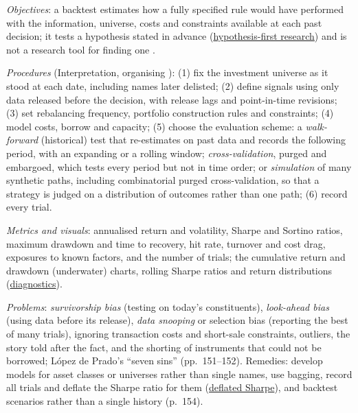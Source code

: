 \begin{qfmethod}\label{meth:backtest-design-evaluation}
 \emph{Objectives}: a backtest estimates how a fully specified rule would have performed with the information, universe, costs and constraints available at each past decision; it tests a hypothesis stated in advance (\hyperref[meth:hypothesis-driven-strategy-research]{hypothesis-first research}) and is not a research tool for finding one \citep[pp.~151--154]{alpha-afml}.

\emph{Procedures} (Interpretation, organising \citep[pp.~161--166]{alpha-afml}): (1) fix the investment universe as it stood at each date, including names later delisted; (2) define signals using only data released before the decision, with release lags and point-in-time revisions; (3) set rebalancing frequency, portfolio construction rules and constraints; (4) model costs, borrow and capacity; (5) choose the evaluation scheme: a \emph{walk-forward} (historical) test that re-estimates on past data and records the following period, with an expanding or a rolling window; \emph{cross-validation}, purged and embargoed, which tests every period but not in time order; or \emph{simulation} of many synthetic paths, including combinatorial purged cross-validation, so that a strategy is judged on a distribution of outcomes rather than one path; (6) record every trial.

\emph{Metrics and visuals}: annualised return and volatility, Sharpe and Sortino ratios, maximum drawdown and time to recovery, hit rate, turnover and cost drag, exposures to known factors, and the number of trials; the cumulative return and drawdown (underwater) charts, rolling Sharpe ratios and return distributions (\hyperref[meth:backtest-evaluation-diagnostics]{diagnostics}).

\emph{Problems}: \emph{survivorship bias} (testing on today's constituents), \emph{look-ahead bias} (using data before its release), \emph{data snooping} or selection bias (reporting the best of many trials), ignoring transaction costs and short-sale constraints, outliers, the story told after the fact, and the shorting of instruments that could not be borrowed; L\'opez de Prado's ``seven sins'' (pp.~151--152). Remedies: develop models for asset classes or universes rather than single names, use bagging, record all trials and deflate the Sharpe ratio for them (\hyperref[meth:deflated-sharpe-ratio]{deflated Sharpe}), and backtest scenarios rather than a single history (p.~154).


\end{qfmethod}
